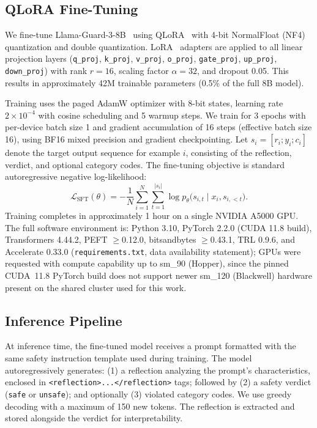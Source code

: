 \documentclass[Superintelligence,article,submit,pdftex,moreauthors]{Definitions/mdpi}
\begin{document}
\subsection{QLoRA Fine-Tuning}

We fine-tune Llama-Guard-3-8B~\citep{metallamaguard3} using QLoRA~\citep{dettmers2024qlora} with 4-bit NormalFloat (NF4) quantization and double quantization. LoRA~\citep{hu2022lora} adapters are applied to all linear projection layers (\texttt{q\_proj}, \texttt{k\_proj}, \texttt{v\_proj}, \texttt{o\_proj}, \texttt{gate\_proj}, \texttt{up\_proj}, \texttt{down\_proj}) with rank $r = 16$, scaling factor $\alpha = 32$, and dropout 0.05. This results in approximately 42M trainable parameters (0.5\% of the full 8B model).

Training uses the paged AdamW optimizer with 8-bit states, learning rate $2 \times 10^{-4}$ with cosine scheduling and 5 warmup steps. We train for 3 epochs with per-device batch size 1 and gradient accumulation of 16 steps (effective batch size 16), using BF16 mixed precision and gradient checkpointing. Let $s_i = [r_i; y_i; c_i]$ denote the target output sequence for example $i$, consisting of the reflection, verdict, and optional category codes. The fine-tuning objective is standard autoregressive negative log-likelihood:
\begin{equation}
  \mathcal{L}_{\text{SFT}}(\theta) = - \frac{1}{N} \sum_{i=1}^{N} \sum_{t=1}^{|s_i|}
  \log p_{\theta}\bigl(s_{i,t} \mid x_i, s_{i,<t}\bigr).
\end{equation}
Training completes in approximately 1 hour on a single NVIDIA A5000 GPU. The full software environment is: Python 3.10, PyTorch 2.2.0 (CUDA 11.8 build), Transformers 4.44.2, PEFT $\geq$0.12.0, bitsandbytes $\geq$0.43.1, TRL 0.9.6, and Accelerate 0.33.0 (\texttt{requirements.txt}, data availability statement); GPUs were requested with compute capability up to sm\_90 (Hopper), since the pinned CUDA~11.8 PyTorch build does not support newer sm\_120 (Blackwell) hardware present on the shared cluster used for this work.

\subsection{Inference Pipeline}

At inference time, the fine-tuned model receives a prompt formatted with the same safety instruction template used during training. The model autoregressively generates: (1) a reflection analyzing the prompt's characteristics, enclosed in \texttt{<reflection>...</reflection>} tags; followed by (2) a safety verdict (\texttt{safe} or \texttt{unsafe}); and optionally (3) violated category codes. We use greedy decoding with a maximum of 150 new tokens. The reflection is extracted and stored alongside the verdict for interpretability.
\end{document}
